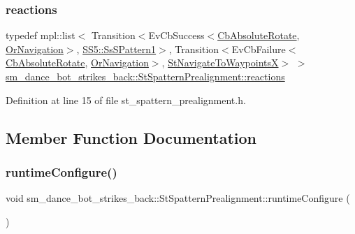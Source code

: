 \subsubsection{\texorpdfstring{reactions}{reactions}}
{\footnotesize\ttfamily typedef mpl\+::list$<$ Transition$<$Ev\+Cb\+Success$<$\hyperlink{classcl__move__base__z_1_1CbAbsoluteRotate}{Cb\+Absolute\+Rotate}, \hyperlink{classsm__dance__bot__strikes__back_1_1OrNavigation}{Or\+Navigation}$>$, \hyperlink{structsm__dance__bot__strikes__back_1_1SS5_1_1SsSPattern1}{S\+S5\+::\+Ss\+S\+Pattern1}$>$, Transition$<$Ev\+Cb\+Failure$<$\hyperlink{classcl__move__base__z_1_1CbAbsoluteRotate}{Cb\+Absolute\+Rotate}, \hyperlink{classsm__dance__bot__strikes__back_1_1OrNavigation}{Or\+Navigation}$>$, \hyperlink{structsm__dance__bot__strikes__back_1_1StNavigateToWaypointsX}{St\+Navigate\+To\+WaypointsX}$>$ $>$ \hyperlink{structsm__dance__bot__strikes__back_1_1StSpatternPrealignment_a40c8319a75f84dc9633a9abc9a5abe7d}{sm\+\_\+dance\+\_\+bot\+\_\+strikes\+\_\+back\+::\+St\+Spattern\+Prealignment\+::reactions}}



Definition at line 15 of file st\+\_\+spattern\+\_\+prealignment.\+h.



\subsection{Member Function Documentation}
\mbox{\label{structsm__dance__bot__strikes__back_1_1StSpatternPrealignment_ad9edd102ef86322d26c9c03a757805b3}} 
\subsubsection{\texorpdfstring{runtime\+Configure()}{runtimeConfigure()}}
{\footnotesize\ttfamily void sm\+\_\+dance\+\_\+bot\+\_\+strikes\+\_\+back\+::\+St\+Spattern\+Prealignment\+::runtime\+Configure (\begin{DoxyParamCaption}{ }\end{DoxyParamCaption})\hspace{0.3cm}{\ttfamily [inline]}}



